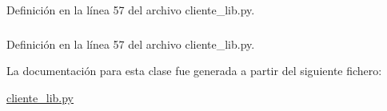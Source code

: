 Definición en la línea 57 del archivo cliente\_\-lib.py.

\hypertarget{classcliente__lib_1_1cliente__lib_aa6b4463261d78e82876d5f01ab3800bb}{
\subsubsection[{y}]{}}
\label{classcliente__lib_1_1cliente__lib_aa6b4463261d78e82876d5f01ab3800bb}


Definición en la línea 57 del archivo cliente\_\-lib.py.



La documentación para esta clase fue generada a partir del siguiente fichero:\begin{DoxyCompactItemize}
\item 
\hyperlink{cliente__lib_8py}{cliente\_\-lib.py}\end{DoxyCompactItemize}
